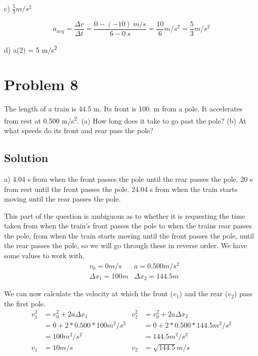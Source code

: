 \documentclass[12pt]{article}
\begin{document}
c) $\frac{5}{3} \unit{m/s^2}$

\begin{equation*}
    a_{avg} = \frac{\Delta v}{\Delta t} = \frac{0 - (-10)\ \unit{m/s}}{6 - 0\ \unit{s}} = \frac{10}{6} \unit{m/s^2} = \boxed{\frac{5}{3} \unit{m/s^2}}
\end{equation*}

d) a(2) = 5 \unit{m/s^2}

\pagebreak
\section*{Problem 8}

The length of a train is 44.5 m. Its front is 100. m from a pole. It accelerates from rest at 0.500 \unit{m/s^2}. (a) How long does it take to go past the pole? (b) At what speeds do its front and rear pass the pole?


\subsection*{Solution}
a) 4.04 s from when the front passes the pole until the rear passes the pole. 20 s from rest until the front passes the pole. 24.04 s from when the train starts moving until the rear passes the pole.

This part of the question is ambiguous as to whether it is requesting the time taken from when the train's front passes the pole to when the trains rear passes the pole, from when the train starts moving until the front passes the pole, until the rear passes the pole, so we will go through these in reverse order. We have some values to work with.
\begin{align*}
    &v_0 = 0 \unit{m/s}     &a = 0.500 \unit{m/s^2}\\
    &\Delta x_1 = 100\unit{m}   &\Delta x_2 = 144.5\unit{m}
\end{align*}

We can now calculate the velocity at which the front ($v_1$) and the rear ($v_2$) pass the first pole.
\begin{align*}
    v_1^2 &= v_0^2 + 2a\Delta x_1           &v_2^2 &= v_0^2 + 2a\Delta x_2\\
        &= 0 + 2*0.500*100 \unit{m^2/s^2}       &&= 0 + 2*0.500*144.5 \unit{m^2/s^2}\\
        &= 100 \unit{m^2/s^2}                   &&= 144.5 \unit{m^2/s^2}\\
    v_1 &= 10 \unit{m/s}                    &v_2 &= \sqrt{144.5} \unit{m/s}
\end{align*}
\end{document}
